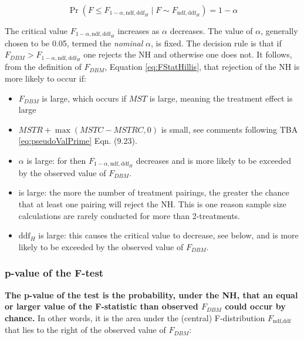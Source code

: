 \documentclass[
]{book}
\providecommand{\tightlist}{%
  \setlength{\itemsep}{0pt}\setlength{\parskip}{0pt}}
\begin{document}
\begin{equation}
\Pr\left ( F\leq F_{1-\alpha,\text{ndf},\text{ddf}_H} \mid F\sim F_{\text{ndf},\text{ddf}_H}\right ) = 1 - \alpha
\label{eq:critValFStat}
\end{equation}

The critical value \(F_{1-\alpha,\text{ndf},\text{ddf}_H}\) increases as \(\alpha\) decreases. The value of \(\alpha\), generally chosen to be 0.05, termed the \emph{nominal} \(\alpha\), is fixed. The decision rule is that if \(F_{DBM} > F_{1-\alpha, \text{ndf}, \text{ddf}_H}\) one rejects the NH and otherwise one does not. It follows, from the definition of \(F_{DBM}\), Equation \eqref{eq:FStatHillis}, that rejection of the NH is more likely to occur if:

\begin{itemize}
\tightlist
\item
  \(F_{DBM}\) is large, which occurs if \(MST\) is large, meaning the treatment effect is large
\item
  \(MSTR + \max \left (MSTC - MSTRC,0 \right )\) is small, see comments following TBA \eqref{eq:pseudoValPrime} Eqn. (9.23).
\item
  \(\alpha\) is large: for then \(F_{1-\alpha,\text{ndf},\text{ddf}_H}\) decreases and is more likely to be exceeded by the observed value of \(F_{DBM}\).
\item
   is large: the more the number of treatment pairings, the greater the chance that at least one pairing will reject the NH. This is one reason sample size calculations are rarely conducted for more than 2-treatments.
\item
  \(\text{ddf}_H\) is large: this causes the critical value to decrease, see below, and is more likely to be exceeded by the observed value of \(F_{DBM}\).
\end{itemize}

\hypertarget{p-value-of-the-f-test}{%
\subsubsection{p-value of the F-test}\label{p-value-of-the-f-test}}

\textbf{The p-value of the test is the probability, under the NH, that an equal or larger value of the F-statistic than observed \(F_{DBM}\) could occur by chance.} In other words, it is the area under the (central) F-distribution \(F_{\text{ndf},\text{ddf}}\) that lies to the right of the observed value of \(F_{DBM}\):
\end{document}
